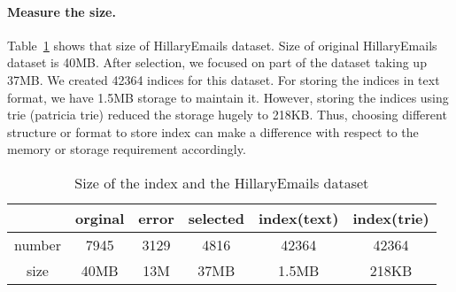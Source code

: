 \paragraph{Measure the size.} Table~\ref{tab:size} shows that size of HillaryEmails dataset. Size of original HillaryEmails dataset is 40MB. After selection, we focused on part of the dataset taking up 37MB. We created 42364 indices for this dataset. For storing the indices in text format, we have 1.5MB storage to maintain it. However, storing the indices using trie (patricia trie) reduced the storage hugely to 218KB. Thus, choosing different structure or format to store index can make a difference with respect to the memory or storage requirement accordingly. 
\begin{table}[!ht]
	\centering
	\begin{tabular}{c|ccccc}
		\toprule
		        & orginal & error & selected & index(text) & index(trie)\\
		\midrule
		number  & 7945    & 3129  & 4816     & 42364   & 42364\\
		size    & 40MB   & 13M   & 37MB      & 1.5MB   & 218KB \\
		\bottomrule
	\end{tabular}
	\caption{Size of the index and the HillaryEmails dataset}
	\label{tab:size}
\end{table}

